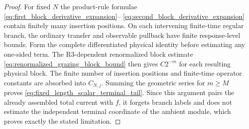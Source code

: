 \documentclass[11pt]{amsart}
\theoremstyle{compactplain}
\theoremstyle{compactdefinition}
\theoremstyle{compactremark}
\begin{document}
\begin{proof}
For fixed \(N\) the product-rule formulae
\eqref{eq:first_block_derivative_expansion}--
\eqref{eq:second_block_derivative_expansion} contain finitely many insertion
positions.  On each intervening finite-time regular branch, the ordinary
transfer and observable pullback have finite response-level bounds.  Form the
complete differentiated physical identity before estimating any one-sided
term.  The R3-dependent renormalized block estimate
\eqref{eq:renormalized_grazing_block_bound} then gives \(C2^{-m}\) for each
resulting physical block.  The finite number of insertion positions and
finite-time operator constants are absorbed into \(C_{N,j}\).  Summing the
geometric series for \(m\ge M\) proves
\eqref{eq:fixed_length_scalar_terminal_tail}.  Since this argument pairs the
already assembled total current with \(f\), it forgets branch labels and does
not estimate the independent terminal coordinate of the ambient module,
which proves exactly the stated limitation.
\end{proof}
\end{document}
